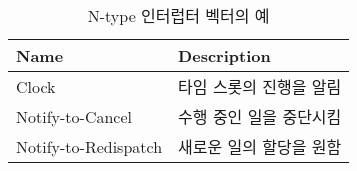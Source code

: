 %
%
\begin{table}[htbp]
\caption{N-type 인터럽터 벡터의 예}\label{table:n-type}
   \begin{center}
   \begin{tabular}{|l|l|} \hline
	Name & Description \\
\hline \hline
	Clock & 타임 스롯의 진행을 알림 \\
	Notify-to-Cancel & 수행 중인 일을 중단시킴 \\
	Notify-to-Redispatch & 새로운 일의 할당을 원함 \\
\hline
   \end{tabular}
   \end{center}
\end{table}
%
%
